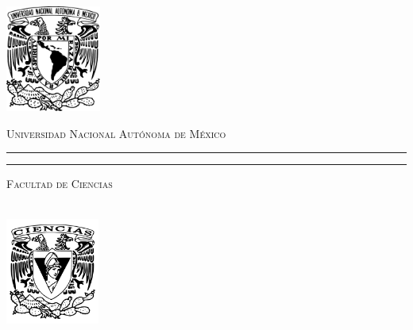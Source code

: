 \documentclass[8pt,leqno,pdflatex,spanish]{book}
\theoremstyle{plain}
\theoremstyle{definition}
\theoremstyle{remark}
\begin{document}

\begin{titlepage}
\thispagestyle{empty}
\begin{minipage}[c][0.17\textheight][c]{0.25\textwidth}
\begin{center}
\includegraphics[height=3.5cm]{Escudo-UNAM.pdf}
\end{center}
\end{minipage}
\begin{minipage}[c][0.195\textheight][t]{0.75\textwidth}
\begin{center}
\vspace{0.3cm}
\textsc{\large Universidad Nacional Aut\'onoma de M\'exico}\\[0.5cm]
\vspace{0.3cm}
\hrule height2.5pt
\vspace{.2cm}
\hrule height1pt
\vspace{.8cm}
\textsc{Facultad de Ciencias}\\[0.5cm] %
\end{center}
\end{minipage}

\begin{minipage}[c][0.81\textheight][t]{0.25\textwidth}
\vspace*{5mm}
\begin{center}
\hskip2.0mm
\vrule width1pt height13cm
\vspace{5mm}
\hskip2pt
\vrule width2.5pt height13cm
\hskip2pt
\vrule width1pt height13cm \\
\vspace{5mm}
\includegraphics[height=3.5cm]{Escudo-FCIENCIAS.pdf}
\end{center}
\end{minipage}
\begin{minipage}[c][0.81\textheight][t]{0.75\textwidth}
\begin{center}
\vspace{1cm}


\end{center}
\end{minipage}
\end{titlepage}
\end{document}
